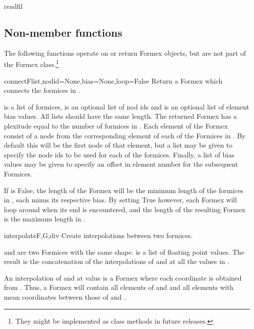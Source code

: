 {{\begin{methoddesc}{read}{fil}
\classmethod
\end{methoddesc}


\subsection{Non-member functions}
The following functions operate on or return Formex objects, but are not part of the Formex class.\footnote{They might be implemented as class methods in future releases.}

\begin{funcdesc}{connect}{Flist,nodid=None,bias=None,loop=False}
Return a Formex which connects the formices in .

 is a list of formices,  is an optional list of nod ids and  is an optional list of element bias values. All lists should have the same length. The returned Formex has a plexitude equal to the number of formices in . Each element of the Formex consist of a node from the corresponding element of each of the Formices in . By default this will be the first node of that element, but a  list may be given to specify the node ids to be used for each of the formices. Finally, a list of bias values may be given to specify an offset in element number for the subsequent Formices.

If  is False, the length of the Formex will be the minimum length of the formices in , each minus its respective bias. By setting  True however, each Formex will loop around when its end is encountered, and the length of the resulting Formex is the maximum length in .
\end{funcdesc}


\begin{funcdesc}{interpolate}{F,G,div}
Create interpolations between two formices.

 and  are two Formices with the same shape.
 is a list of floating point values.
The result is the concatenation of the interpolations of  and  at all the values in .

An interpolation of  and  at value  is a Formex  where each coordinate  is obtained from  .
Thus, a Formex  will contain all elements
of  and  and all elements with mean coordinates between those of  and .


\end{funcdesc}}}
